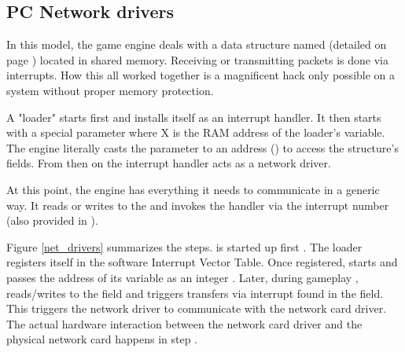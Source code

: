 




\subsection{PC Network drivers}
In this model, the game engine deals with a data structure named  (detailed on page \pageref{doomcom_t.c}) located in shared memory. Receiving or transmitting packets is done via interrupts. How this all worked together is a magnificent hack only possible on a system without proper memory protection.\\
\par
A "loader" starts first and installs itself as an interrupt handler. It then starts  with a special parameter  where X is the RAM address of the loader's  variable. The engine literally casts the parameter to an address () to access the structure's fields. From then on the interrupt handler acts as a network driver.\\
\par

\par
 At this point, the engine has everything it needs to communicate in a generic way. It reads or writes to the  and invokes the handler via the interrupt number (also provided in ).\\
\par
{}
\par
\vspace{-10pt}
 Figure \ref{net_drivers} summarizes the steps.  is started up first . The loader registers itself in the software Interrupt Vector Table. Once registered,  starts  and passes the address of its  variable as an integer . Later, during gameplay ,  reads/writes to the   field and triggers transfers via interrupt found in the  field. This triggers  the \doom{} network driver to communicate with the network card driver. The actual hardware interaction between the network card driver and the physical network card happens in step .




